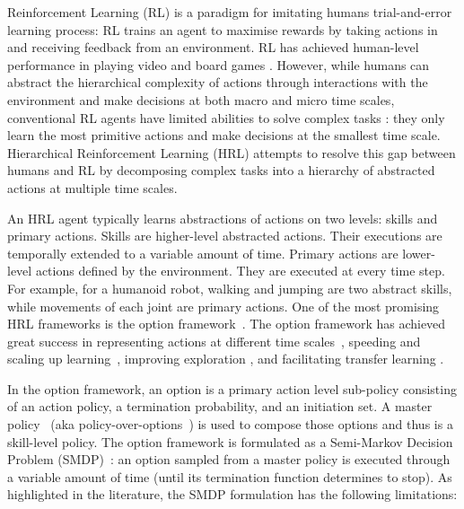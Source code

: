 
Reinforcement Learning (RL) is a paradigm for imitating humans
trial-and-error learning process: RL trains an agent to maximise
rewards by taking actions in and receiving feedback from an
environment. RL has achieved human-level performance in playing
video and board games \cite{mnih2015human,silver2016mastering}.
However, while humans can abstract the hierarchical complexity of
actions through interactions with the environment and make
decisions at both macro and micro time scales, conventional RL
agents have limited abilities to solve complex tasks
\cite{daniel2016probabilistic}: they only learn the most
primitive actions and make decisions at the smallest time scale.
Hierarchical Reinforcement Learning (HRL) attempts to resolve
this gap between humans and RL by decomposing complex tasks into
a hierarchy of abstracted actions at multiple time scales.

An HRL agent typically learns abstractions of actions on two
levels: skills and primary actions. Skills are higher-level
abstracted actions. Their executions are temporally extended to a
variable amount of time. Primary actions are lower-level actions
defined by the environment. They are executed at every time step.
For example, for a humanoid robot, walking and jumping are two
abstract skills, while movements of each joint are primary
actions. One of the most promising HRL frameworks is the option
framework~\cite{sutton1999between}. The option framework has
achieved great success in representing actions at different time
scales~\cite{bacon2017option}, speeding and scaling up
learning~\cite{bacon2018temporal}, improving exploration
\cite{harb2018waiting}, and facilitating transfer learning
\cite{zhang2019dac}.

In the option framework, an option is a primary action level
sub-policy consisting of an action policy, a termination
probability, and an initiation set. A master
policy~\cite{zhang2019dac} (aka
policy-over-options~\cite{sutton1999between}) is used to compose
those options and thus is a skill-level policy. The option
framework is formulated as a Semi-Markov Decision Problem
(SMDP)~\cite{puterman2014markov}: an option sampled from a master
policy is executed through a variable amount of time (until its
termination function determines to stop). As highlighted in the
literature, the SMDP formulation has the following limitations:

